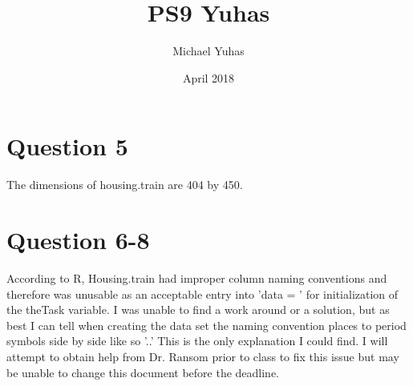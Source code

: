 \documentclass{article}
\title{PS9 Yuhas}
\author{Michael Yuhas }
\date{April 2018}
\begin{document}
\maketitle
 
\section{Question 5}
The dimensions of housing.train are 404 by 450. 
\section{Question 6-8}
 According to R, Housing.train had improper column naming 
conventions and therefore was unusable as an acceptable entry into 'data = ' for 
initialization of the theTask variable.  I was unable to find a work around or a 
solution, but as best I can tell when creating the data set the naming convention 
places to period symbols side by side like so '..' This is the only explanation I 
could find.  I will attempt to obtain help from Dr. Ransom prior to class to fix 
this issue but may be unable to change this document before the deadline. 
\end{document}
